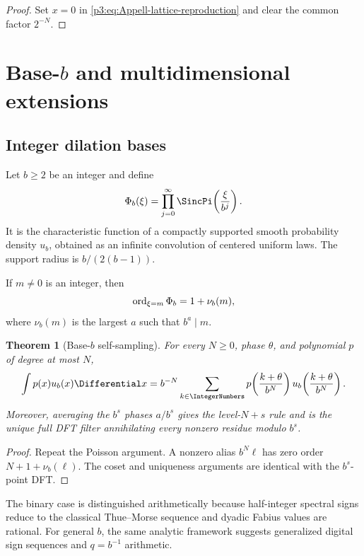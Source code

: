 \documentclass[11pt,oneside]{article}
\numberwithin{equation}{section}
\newtheorem{theorem}{Theorem}[section]
\theoremstyle{definition}
\theoremstyle{remark}
\begin{document}
\begin{proof}
Set $x=0$ in \eqref{p3:eq:Appell-lattice-reproduction} and clear the common factor $2^{-N}$.
\end{proof}

\section{Base-$b$ and multidimensional extensions}
\label{p3:sec:extensions}

\subsection{Integer dilation bases}

Let $b\ge2$ be an integer and define
\begin{equation}
 \Phi_b(\xi)=\prod_{j=0}^{\infty}
 \SincPi\!\left(\frac{\xi}{b^j}\right).
 \label{p3:eq:Phi-b}
\end{equation}
It is the characteristic function of a compactly supported smooth probability density $u_b$, obtained as an infinite convolution of centered uniform laws.  The support radius is $b/(2(b-1))$.

If $m\ne0$ is an integer, then
\begin{equation}
 \operatorname{ord}_{\xi=m}\Phi_b=1+\nu_b(m),
 \label{p3:eq:b-multiplicity}
\end{equation}
where $\nu_b(m)$ is the largest $a$ such that $b^a\mid m$.

\begin{theorem}[Base-$b$ self-sampling]
\label{p3:thm:base-b}
For every $N\ge0$, phase $\theta$, and polynomial $p$ of degree at most $N$,
\begin{equation}
 \int p(x)u_b(x)\Differential x
 =b^{-N}\sum_{k\in\IntegerNumbers}
 p\!\left(\frac{k+\theta}{b^N}\right)
 u_b\!\left(\frac{k+\theta}{b^N}\right).
 \label{p3:eq:base-b-self-sampling}
\end{equation}
Moreover, averaging the $b^s$ phases $a/b^s$ gives the level-$N+s$ rule and is the unique full DFT filter annihilating every nonzero residue modulo $b^s$.
\end{theorem}

\begin{proof}
Repeat the Poisson argument.  A nonzero alias $b^N\ell$ has zero order $N+1+\nu_b(\ell)$.  The coset and uniqueness arguments are identical with the $b^s$-point DFT.
\end{proof}

The binary case is distinguished arithmetically because half-integer spectral signs reduce to the classical Thue--Morse sequence and dyadic Fabius values are rational.  For general $b$, the same analytic framework suggests generalized digital sign sequences and $q=b^{-1}$ arithmetic.
\end{document}
